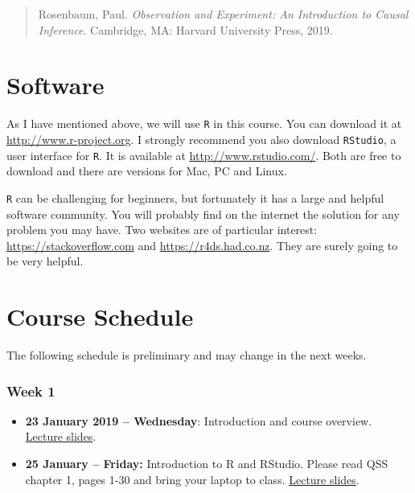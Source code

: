 \documentclass[a4paper,12pt]{article}
\begin{document}
\begin{quote}
Rosenbaum, Paul. \textit{Observation and Experiment: An Introduction to Causal Inference}. Cambridge, MA: Harvard University Press, 2019.
\end{quote}



\section{Software}%
\label{sec:software}

As I have mentioned above, we will use \texttt{R} in this course. You can download it at \href{http://www.r-project.org}{http://www.r-project.org}. I strongly recommend you also download \texttt{RStudio}, a user interface for \texttt{R}. It is available at \href{http://www.rstudio.com/}{http://www.rstudio.com/}. Both are free to download and there are versions for Mac, PC and Linux.

\texttt{R} can be challenging for beginners, but fortunately it has a large and helpful software community. You will probably find on the internet the solution for any problem you may have. Two websites are of particular interest: \href{https://stackoverflow.com}{https://stackoverflow.com} and \href{https://r4ds.had.co.nz}{https://r4ds.had.co.nz}. They are surely going to be very helpful. 

\section{Course Schedule}%
\label{sec:course_schedule}

The following schedule is preliminary and may change in the next weeks. 

\subsubsection*{Week 1}

\begin{itemize}
	\item \textbf{23 January 2019 -- Wednesday}: Introduction and course overview. \href{https://pols1600.github.io/slides/week01a/week01a.html}{Lecture slides}.
	\item \textbf{25 January -- Friday:} Introduction to R and RStudio. Please read QSS chapter 1, pages 1-30 and bring your laptop to class. \href{https://pols1600.github.io/slides/week01b/week01b.html}{Lecture slides}. 
\end{itemize}
\end{document}
